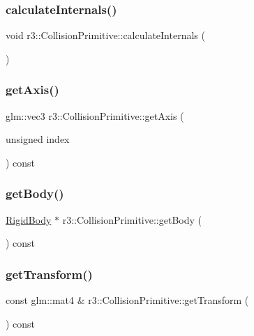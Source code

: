 \subsubsection{\texorpdfstring{calculate\+Internals()}{calculateInternals()}}
{\footnotesize\ttfamily void r3\+::\+Collision\+Primitive\+::calculate\+Internals (\begin{DoxyParamCaption}{ }\end{DoxyParamCaption})}

\mbox{\label{classr3_1_1_collision_primitive_a78c959f5ca0a09a0fc2038ac7f30e45a}} 
\subsubsection{\texorpdfstring{get\+Axis()}{getAxis()}}
{\footnotesize\ttfamily glm\+::vec3 r3\+::\+Collision\+Primitive\+::get\+Axis (\begin{DoxyParamCaption}\item[{unsigned}]{index }\end{DoxyParamCaption}) const}

\mbox{\label{classr3_1_1_collision_primitive_af8dbda90cce34a6262309cbdb75feea7}} 
\subsubsection{\texorpdfstring{get\+Body()}{getBody()}}
{\footnotesize\ttfamily \mbox{\hyperlink{classr3_1_1_rigid_body}{Rigid\+Body}} $\ast$ r3\+::\+Collision\+Primitive\+::get\+Body (\begin{DoxyParamCaption}{ }\end{DoxyParamCaption}) const}

\mbox{\label{classr3_1_1_collision_primitive_acc4e2139c698bab280338db36d7cc586}} 
\subsubsection{\texorpdfstring{get\+Transform()}{getTransform()}}
{\footnotesize\ttfamily const glm\+::mat4 \& r3\+::\+Collision\+Primitive\+::get\+Transform (\begin{DoxyParamCaption}{ }\end{DoxyParamCaption}) const}

